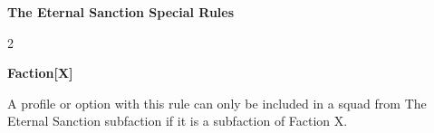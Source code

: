 \documentclass{article}
\begin{document}
\vspace{0.6cm}

{\large \textbf{The Eternal Sanction Special Rules}}
\vspace{0.3cm}
\begin{multicols}{2}
    {\scriptsize

    \begin{minipage}{9cm}
        {\normalsize \textbf{Faction[X]}}
        \vspace{0.3cm}

        A profile or option with this rule can only be included in a squad from
        The Eternal Sanction subfaction if it is a subfaction of Faction X.
    \end{minipage}

    }
\end{multicols}
\end{document}
